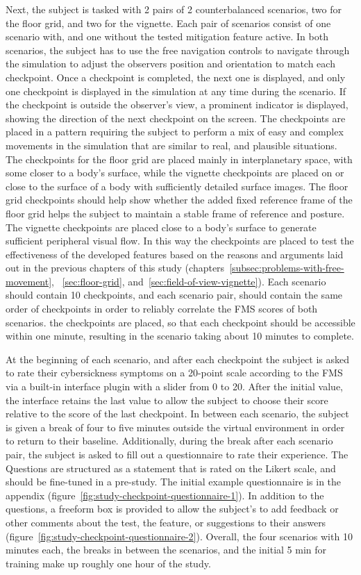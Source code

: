 Next, the subject is tasked with 2 pairs of 2 counterbalanced scenarios, two for the floor grid, and two for the
vignette.
Each pair of scenarios consist of one scenario with, and one without the tested mitigation feature active.
In both scenarios, the subject has to use the free navigation controls to navigate through the simulation to adjust
the observers position and orientation to match each checkpoint.
Once a checkpoint is completed, the next one is displayed, and only one checkpoint is displayed in the simulation at
any time during the scenario.
If the checkpoint is outside the observer's view, a prominent indicator is displayed, showing the direction of the
next checkpoint on the screen.
The checkpoints are placed in a pattern requiring the subject to perform a mix of easy and complex movements in the
simulation that are similar to real, and plausible situations.
The checkpoints for the floor grid are placed mainly in interplanetary space, with some closer to a body's surface,
while the vignette checkpoints are placed on or close to the surface of a body with sufficiently detailed surface
images.
The floor grid checkpoints should help show whether the added fixed reference frame of the floor grid helps the
subject to maintain a stable frame of reference and posture.
The vignette checkpoints are placed close to a body's surface to generate sufficient peripheral visual flow.
In this way the checkpoints are placed to test the effectiveness of the developed features based on the reasons and
arguments laid out in the previous chapters of this study (chapters~\ref{subsec:problems-with-free-movement},
~\ref{sec:floor-grid}, and~\ref{sec:field-of-view-vignette}).
Each scenario should contain 10 checkpoints, and each scenario pair, should contain the same order of checkpoints in
order to reliably correlate the FMS scores of both scenarios.
the checkpoints are placed, so that each checkpoint should be accessible within one minute, resulting in the scenario
taking about 10 minutes to complete.

At the beginning of each scenario, and after each checkpoint the subject is asked to rate their cybersickness symptoms
on a 20-point scale according to the FMS via a built-in interface plugin with a slider from 0 to 20.
After the initial value, the interface retains the last value to allow the subject to choose their score relative to
the score of the last checkpoint.
In between each scenario, the subject is given a break of four to five minutes outside the virtual environment in
order to return to their baseline.
Additionally, during the break after each scenario pair, the subject is asked to fill out a questionnaire to rate
their experience.
The Questions are structured as a statement that is rated on the Likert scale, and should be fine-tuned in a pre-study.
The initial example questionnaire is in the appendix (figure~\ref{fig:study-checkpoint-questionnaire-1}).
In addition to the questions, a freeform box is provided to allow the subject's to add feedback or other comments
about the test, the feature, or suggestions to their answers (figure~\ref{fig:study-checkpoint-questionnaire-2}).
Overall, the four scenarios with 10 minutes each, the breaks in between the scenarios, and the initial 5 min for
training make up roughly one hour of the study.

